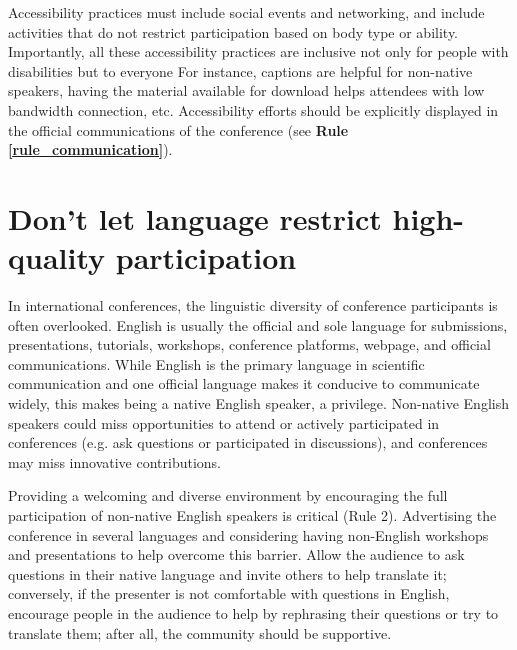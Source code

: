 \documentclass[10pt,letterpaper]{article}
\begin{document}
Accessibility practices must include social events and networking, and include activities that do not restrict participation based on body type or ability. Importantly, all these accessibility practices are inclusive not only for people with disabilities but to everyone %
For instance, captions are helpful for non-native speakers, having the material available for download helps attendees with low bandwidth connection, etc. Accessibility efforts should be explicitly displayed in the official communications of the conference (see \textbf{Rule \ref{rule_communication}}). 




\section{Don't let language restrict high-quality participation}
\label{rule_language}

In international conferences, the linguistic diversity of conference participants is often overlooked. 
English is usually the official and sole language for submissions, presentations, tutorials, workshops, conference platforms, webpage, and official communications. 
While English is the primary language in scientific communication and one official language makes it conducive to communicate widely, this makes being a native English speaker, a privilege.
Non-native English speakers could miss opportunities to attend or actively participated in conferences (e.g. ask questions or participated in discussions),
and conferences may miss innovative contributions.

Providing a welcoming and diverse environment by encouraging the full participation of non-native English speakers is critical (Rule 2). 
Advertising the conference in several languages and considering having non-English workshops and presentations to help overcome this barrier. 
Allow the audience to ask questions in their native language and invite others to help translate it; conversely, if the presenter is not comfortable with questions in English, encourage people in the audience to help by rephrasing their questions or try to translate them; after all, the community should be supportive. 

\end{document}
